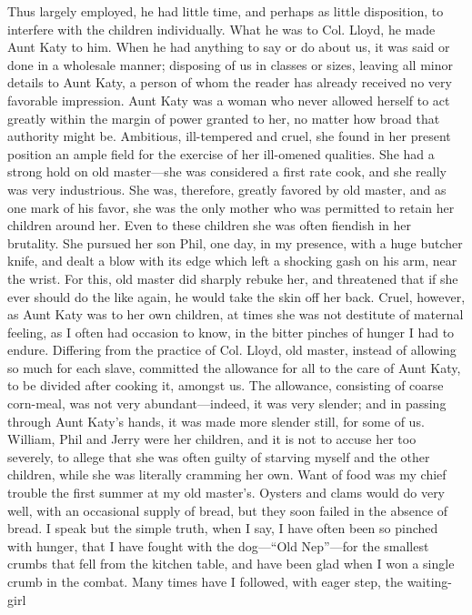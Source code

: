 Thus largely employed, he had little time, and perhaps as little
disposition, to interfere with the children individually. What he was to
Col. Lloyd, he made Aunt Katy to him. When he had anything to say or do
about us, it was said or done in a wholesale manner; disposing of us in
classes or sizes, leaving all minor details to Aunt Katy, a person of
whom the reader has already received no very favorable impression. Aunt
Katy was a woman who never allowed herself to act greatly within the
margin of power granted to her, no matter how broad that authority might
be. Ambitious, ill-tempered and cruel, she found in her present position
an ample field for the exercise of her ill-omened qualities. She had a
strong hold on old master---she was considered a first rate cook, and
she really was very industrious. She was, therefore, greatly favored by
old master, and as one mark of his favor, she was the only mother who
was permitted to retain her children around her. Even to these children
she was often fiendish in her {\protect\hypertarget{75}{}{}}brutality.
She pursued her son Phil, one day, in my presence, with a huge butcher
knife, and dealt a blow with its edge which left a shocking gash on his
arm, near the wrist. For this, old master did sharply rebuke her, and
threatened that if she ever should do the like again, he would take the
skin off her back. Cruel, however, as Aunt Katy was to her own children,
at times she was not destitute of maternal feeling, as I often had
occasion to know, in the bitter pinches of hunger I had to endure.
Differing from the practice of Col. Lloyd, old master, instead of
allowing so much for each slave, committed the allowance for all to the
care of Aunt Katy, to be divided after cooking it, amongst us. The
allowance, consisting of coarse corn-meal, was not very
abundant---indeed, it was very slender; and in passing through Aunt
Katy's hands, it was made more slender still, for some of us. William,
Phil and Jerry were her children, and it is not to accuse her too
severely, to allege that she was often guilty of starving myself and the
other children, while she was literally cramming her own. Want of food
was my chief trouble the first summer at my old master's. Oysters and
clams would do very well, with an occasional supply of bread, but they
soon failed in the absence of bread. I speak but the simple truth, when
I say, I have often been so pinched with hunger, that I have fought with
the dog---``Old Nep''---for the smallest crumbs that fell from the
kitchen table, and have been glad when I won a single crumb in the
combat. Many times have I followed, with eager step, the waiting-girl
